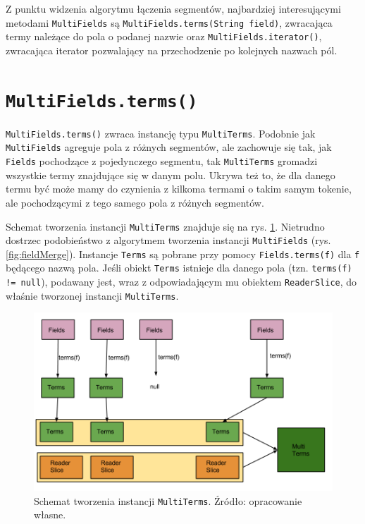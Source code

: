 Z punktu widzenia algorytmu łączenia segmentów, najbardziej interesującymi metodami \texttt{MultiFields} są \texttt{MultiFields.terms(String field)}, zwracająca termy należące do pola o podanej nazwie oraz \texttt{MultiFields.iterator()}, zwracająca iterator pozwalający na przechodzenie po kolejnych nazwach pól. 

\section{\texttt{MultiFields.terms()}}

\texttt{MultiFields.terms()} zwraca instancję typu \texttt{MultiTerms}. Podobnie jak \texttt{MultiFields} agreguje pola z różnych segmentów, ale zachowuje się tak, jak \texttt{Fields} pochodzące z pojedynczego segmentu, tak \texttt{MultiTerms}  gromadzi wszystkie termy znajdujące się w danym polu. Ukrywa też to, że dla danego termu być może mamy do czynienia z kilkoma termami o takim samym tokenie, ale pochodzącymi z tego samego pola z różnych segmentów.

Schemat tworzenia instancji \texttt{MultiTerms} znajduje się na rys. \ref{fig:multiTerms}. Nietrudno dostrzec podobieństwo z algorytmem tworzenia instancji \texttt{MultiFields} (rys. \ref{fig:fieldMerge}). Instancje \texttt{Terms} są pobrane przy pomocy \texttt{Fields.terms(f)} dla \texttt{f} będącego nazwą pola. Jeśli obiekt \texttt{Terms} istnieje dla danego pola (tzn. \texttt{terms(f) != null}), podawany jest, wraz z odpowiadającym mu obiektem \texttt{ReaderSlice}, do właśnie tworzonej instancji \texttt{MultiTerms}.

\begin{figure}[here]
 \centering
 \includegraphics[scale=0.4]{pictures/MultiTerms.png}
 \caption{Schemat tworzenia instancji \texttt{MultiTerms}. Źródło: opracowanie własne. \label{fig:multiTerms}}
\end{figure}

